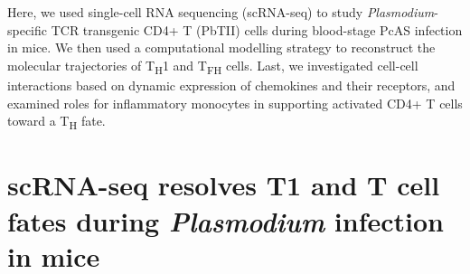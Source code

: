 Here, we used single-cell RNA sequencing (scRNA-seq) to study \textit{Plasmodium}-specific TCR transgenic CD4+ T (PbTII) cells during blood-stage PcAS infection in mice. We then used a computational modelling strategy to reconstruct the molecular trajectories of T\textsubscript{H}1 and T\textsubscript{FH} cells. Last, we investigated cell-cell interactions based on dynamic expression of chemokines and their receptors, and examined roles for inflammatory monocytes in supporting activated CD4+ T cells toward a T\textsubscript{H} fate.

\section{scRNA-seq resolves \texorpdfstring{T1}{TH1} and \texorpdfstring{T}{TFH} cell fates during \textit{Plasmodium} infection in mice}


